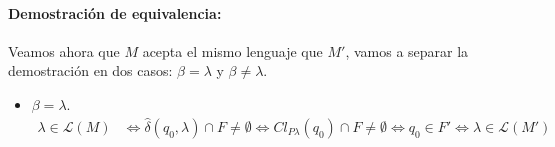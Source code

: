 \paragraph{Demostración de equivalencia:} Veamos ahora que \(M\) acepta el mismo lenguaje que \(M'\), vamos a separar la demostración en dos casos: \(\beta=\lambda\) y \(\beta \neq \lambda\).
\begin{itemize}
  \item \(\beta=\lambda\).
        \begin{align*}
          \lambda\in \mathcal{L}(M) & \Leftrightarrow \hat\delta(q_0,\lambda)\cap F \neq \emptyset \Leftrightarrow Cl_{P\lambda}(q_0)\cap F \neq \emptyset \Leftrightarrow q_0\in F' \Leftrightarrow \lambda\in \mathcal{L}(M')
        \end{align*}
\end{itemize}




